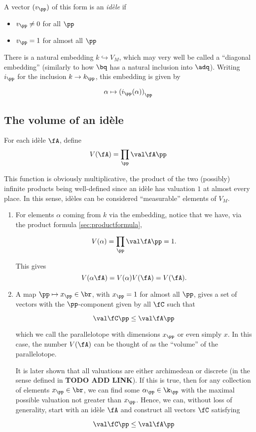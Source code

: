 \begin{defn}
  A vector $(v_\pp)$ of this form is an \textit{id\`ele} if
  \begin{itemize}
  \item $v_\pp\neq 0$ for all $\pp$
  \item $v_\pp = 1$ for almost all $\pp$
  \end{itemize}
\end{defn}

There is a natural embedding $k\hookrightarrow V_M$, which may very well be
called a ``diagonal embedding'' (similarly to how $\bq$ has a natural inclusion
into $\adq$). Writing $i_\pp$ for the inclusion $k\to k_\pp$, this embedding
is given by

\[\alpha\mapsto{ (i_\pp(\alpha)) }_\pp\]

\subsection{The volume of an id\`ele}
\label{sec:orgheadline12}

For each id\`ele $\fA$, define
\[V(\fA) = \prod_\pp \val\fA\pp \]

This function is obviously multiplicative, the product of the two (possibly) infinite
products being well-defined since an id\`ele has valuation $1$ at almost every
place. In this sense, id\`eles can be considered ``measurable'' elements of $V_M$.

\begin{enumerate}
\item For elements $\alpha$ coming from $k$ via the embedding, notice that we have, via
  the product formula \ref{sec:productformula},

  \[V(\alpha) = \prod_\pp \val\fA\pp = 1.\]

  This gives \[V(\alpha\fA) = V(\alpha)V(\fA) = V(\fA). \]

\item A map $\pp\mapsto x_\pp \in\br$, with $x_\pp = 1$ for almost all
  $\pp$, gives a set of vectors with the $\pp$-component given by all $\fC$
  such that

  \[\val \fC\pp \leq \val\fA\pp\]

  which we call the parallelotope with dimensions $x_\pp$ or even simply $x$. In this
  case, the number $V(\fA)$ can be thought of as the ``volume'' of the
  parallelotope.

  It is later shown that all valuations are either archimedean or discrete (in
  the sense defined in \textbf{TODO ADD LINK}). If this is true, then for any
  collection of elements $x_\pp \in \br$, we can find some $\alpha_\pp \in
  \k_\pp$ with the maximal possible valuation not greater than $x_\pp$. Hence,
  we can, without loss of generality, start with an id\`ele $\fA$ and construct
  all vectors $\fC$ satisfying

  \[ \val \fC \pp \leq \val \fA \pp \]

\end{enumerate}

